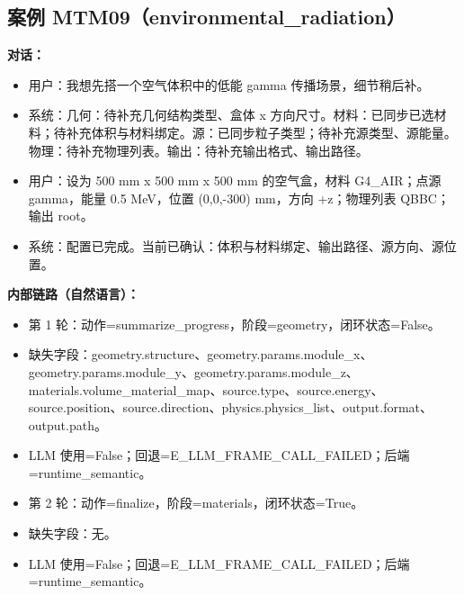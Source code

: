 \documentclass[11pt]{ctexart}
\begin{document}
\subsection{案例 MTM09（environmental\_radiation）}
\textbf{对话：}
\begin{itemize}
\item 用户：我想先搭一个空气体积中的低能 gamma 传播场景，细节稍后补。
\item 系统：几何：待补充几何结构类型、盒体 x 方向尺寸。材料：已同步已选材料；待补充体积与材料绑定。源：已同步粒子类型；待补充源类型、源能量。物理：待补充物理列表。输出：待补充输出格式、输出路径。
\item 用户：设为 500 mm x 500 mm x 500 mm 的空气盒，材料 G4\_AIR；点源 gamma，能量 0.5 MeV，位置 (0,0,-300) mm，方向 +z；物理列表 QBBC；输出 root。
\item 系统：配置已完成。当前已确认：体积与材料绑定、输出路径、源方向、源位置。
\end{itemize}
\textbf{内部链路（自然语言）：}
\begin{itemize}
\item 第 1 轮：动作=summarize\_progress，阶段=geometry，闭环状态=False。
\item 缺失字段：geometry.structure、geometry.params.module\_x、geometry.params.module\_y、geometry.params.module\_z、materials.volume\_material\_map、source.type、source.energy、source.position、source.direction、physics.physics\_list、output.format、output.path。
\item LLM 使用=False；回退=E\_LLM\_FRAME\_CALL\_FAILED；后端=runtime\_semantic。
\item 第 2 轮：动作=finalize，阶段=materials，闭环状态=True。
\item 缺失字段：无。
\item LLM 使用=False；回退=E\_LLM\_FRAME\_CALL\_FAILED；后端=runtime\_semantic。
\end{itemize}
\end{document}
